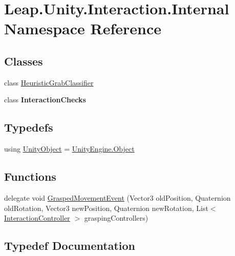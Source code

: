 \hypertarget{namespace_leap_1_1_unity_1_1_interaction_1_1_internal}{}\section{Leap.\+Unity.\+Interaction.\+Internal Namespace Reference}
\label{namespace_leap_1_1_unity_1_1_interaction_1_1_internal}
\subsection*{Classes}
\begin{DoxyCompactItemize}
\item 
class \mbox{\hyperlink{class_leap_1_1_unity_1_1_interaction_1_1_internal_1_1_heuristic_grab_classifier}{Heuristic\+Grab\+Classifier}}
\item 
class {\bfseries Interaction\+Checks}
\end{DoxyCompactItemize}
\subsection*{Typedefs}
\begin{DoxyCompactItemize}
\item 
using \mbox{\hyperlink{namespace_leap_1_1_unity_1_1_interaction_1_1_internal_afd0057d3352139df1a5ca0526cbabe20}{Unity\+Object}} = \mbox{\hyperlink{namespace_leap_1_1_unity_1_1_interaction_a7a6c3499f7b7d02b0d389e8ac72a315fa497031794414a552435f90151ac3b54b}{Unity\+Engine.\+Object}}
\end{DoxyCompactItemize}
\subsection*{Functions}
\begin{DoxyCompactItemize}
\item 
delegate void \mbox{\hyperlink{namespace_leap_1_1_unity_1_1_interaction_1_1_internal_a7aa34e7934479947979298ee96ced081}{Grasped\+Movement\+Event}} (Vector3 old\+Position, Quaternion old\+Rotation, Vector3 new\+Position, Quaternion new\+Rotation, List$<$ \mbox{\hyperlink{class_leap_1_1_unity_1_1_interaction_1_1_interaction_controller}{Interaction\+Controller}} $>$ grasping\+Controllers)
\end{DoxyCompactItemize}


\subsection{Typedef Documentation}
\mbox{\label{namespace_leap_1_1_unity_1_1_interaction_1_1_internal_afd0057d3352139df1a5ca0526cbabe20}} 
